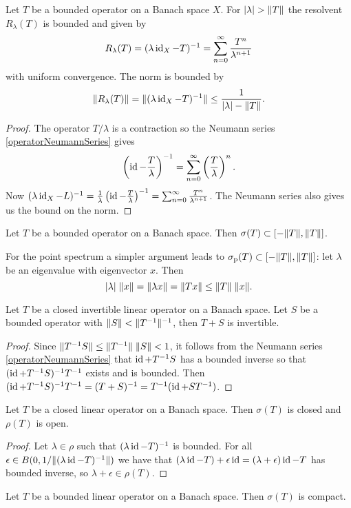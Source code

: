 \begin{proposition}
Let $T$ be a bounded operator on a Banach space $X$. For $|\lambda|>\norm{T}$ the resolvent $R_\lambda(T)$ is bounded and given by
\[ R_\lambda(T) = (\lambda \operatorname{id}_X - T)^{-1} = \sum_{n=0}^\infty\frac{T^n}{\lambda^{n+1}} \]
with uniform convergence. The norm is bounded by
\[ \lVert R_\lambda(T)\rVert = \lVert(\lambda \operatorname{id}_X - T)^{-1}\rVert \leq \frac{1}{|\lambda|-\lVert T\rVert}. \]
\end{proposition}
\begin{proof}
The operator $T/\lambda$ is a contraction so the Neumann series \ref{operatorNeumannSeries} gives
\[ \left(\operatorname{id} - \frac{T}{\lambda}\right)^{-1} = \sum_{n=0}^\infty \left(\frac{T}{\lambda}\right)^n.  \]
Now $(\lambda \operatorname{id}_X - L)^{-1} = \frac{1}{\lambda}\left(\operatorname{id} - \frac{T}{\lambda}\right)^{-1} = \sum_{n=0}^\infty \frac{T^n}{\lambda^{n+1}}$. The Neumann series also gives us the bound on the norm.
\end{proof}
\begin{corollary}
Let $T$ be a bounded operator on a Banach space. Then $\sigma(T)\subset [-\lVert T\rVert, \lVert T\rVert]$.
\end{corollary}

For the point spectrum a simpler argument leads to $\sigma_\text{p}(T)\subset [-\lVert T\rVert, \lVert T\rVert]$: let $\lambda$ be an eigenvalue with eigenvector $x$. Then
\[ |\lambda|\;\lVert x\rVert = \lVert\lambda x\rVert = \lVert Tx\rVert \leq \lVert T\rVert\;\lVert x\rVert. \]

\begin{proposition}
Let $T$ be a closed invertible linear operator on a Banach space. Let $S$ be a bounded operator with $\lVert S\rVert < \lVert T^{-1}\rVert^{-1}$, then $T+S$ is invertible.
\end{proposition}
\begin{proof}
Since $\lVert T^{-1}S\rVert \leq \lVert T^{-1}\rVert\;\lVert S\rVert < 1$, it follows from the Neumann series \ref{operatorNeumannSeries} that $\operatorname{id} + T^{-1}S$ has a bounded inverse so that $(\operatorname{id} + T^{-1}S)^{-1}T^{-1}$ exists and is bounded. Then $(\operatorname{id} + T^{-1}S)^{-1}T^{-1} = (T+S)^{-1} = T^{-1}(\operatorname{id} + ST^{-1})$.
\end{proof}
\begin{corollary}
Let $T$ be a closed linear operator on a Banach space. Then $\sigma(T)$ is closed and $\rho(T)$ is open.
\end{corollary}
\begin{proof}
Let $\lambda \in \rho$ such that $(\lambda\operatorname{id} - T)^{-1}$ is bounded. For all $\epsilon \in B(0, 1/\lVert(\lambda\operatorname{id} - T)^{-1}\rVert)$ we have that $(\lambda\operatorname{id} - T) + \epsilon\operatorname{id} = (\lambda +\epsilon)\operatorname{id} -T$ has bounded inverse, so $\lambda + \epsilon \in \rho(T)$.
\end{proof}
\begin{corollary}
Let $T$ be a bounded linear operator on a Banach space. Then $\sigma(T)$ is compact.
\end{corollary}

